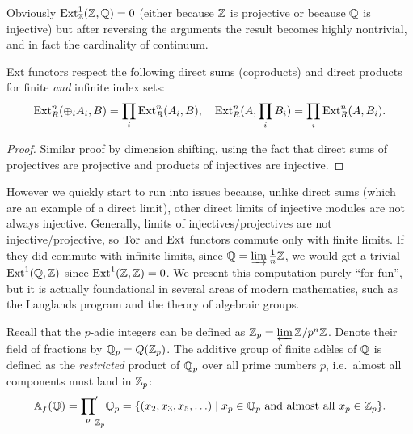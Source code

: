 Obviously $\operatorname{Ext}^1_{\mathbb{Z}}(\mathbb{Z},\mathbb{Q})=0$ (either because $\mathbb{Z}$ is projective or because $\mathbb{Q}$ is injective) but after reversing the arguments the result becomes highly nontrivial, and in fact the cardinality of continuum.

\begin{thm} Ext functors respect the following direct sums (coproducts) and direct products for finite \emph{and} infinite index sets:
    \[\operatorname{Ext}_R^n(\oplus_i A_i,B)=\prod_i\operatorname{Ext}_R^n(A_i,B),\quad \operatorname{Ext}_R^n(A,\prod_i B_i)=\prod_i \operatorname{Ext}_R^n(A,B_i).\]
\end{thm}
\begin{proof}
    Similar proof by dimension shifting, using the fact that direct sums of projectives are projective and products of injectives are injective.
\end{proof}

However we quickly start to run into issues because, unlike direct sums (which are an example of a direct limit), other direct limits of injective modules are not always injective. Generally, limits of injectives/projectives are not injective/projective, so $\operatorname{Tor}$ and $\operatorname{Ext}$ functors commute only with finite  limits. If they did commute with infinite limits, since $\mathbb{Q}=\varinjlim \frac{1}{n}\mathbb{Z}$, we would get a trivial $\operatorname{Ext}^1(\mathbb{Q},\mathbb{Z})$ since $\operatorname{Ext}^1(\mathbb{Z},\mathbb{Z})=0$. We present this computation purely ``for fun'', but it is actually foundational in several areas of modern mathematics, such as the Langlands program and the theory of algebraic groups.

\begin{defn}
    Recall that the $p$-adic integers can be defined as $\mathbb{Z}_p=\varprojlim \mathbb{Z}\slash p^n\mathbb{Z}$. Denote their field of fractions by $\mathbb{Q}_p=Q(\mathbb{Z}_p)$. The additive group of finite ad\`eles of $\mathbb{Q}$ is defined as the \emph{restricted} product of $\mathbb{Q}_p$ over all prime numbers $p$, i.e.~almost all components must land in $\mathbb{Z}_p$:
    \[\mathbb{A}_f(\mathbb{Q})={\prod_{p}}^\prime_{\mathbb{Z}_p}\mathbb{Q}_p=\{(x_2,x_3,x_5,\ldots)\mid x_p\in\mathbb{Q}_p \text{ and almost all }x_p\in\mathbb{Z}_p \}.\]
\end{defn}

